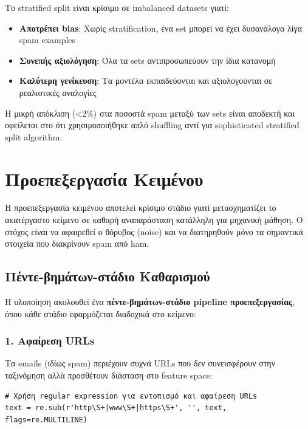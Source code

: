 \documentclass[12pt,a4paper,twoside]{book}
\begin{document}
Το stratified split είναι κρίσιμο σε imbalanced datasets γιατί:

\begin{itemize}
    \item \textbf{Αποτρέπει bias}: Χωρίς stratification, ένα set μπορεί να έχει δυσανάλογα λίγα spam examples
    \item \textbf{Συνεπής αξιολόγηση}: Όλα τα sets αντιπροσωπεύουν την ίδια κατανομή
    \item \textbf{Καλύτερη γενίκευση}: Τα μοντέλα εκπαιδεύονται και αξιολογούνται σε ρεαλιστικές αναλογίες
\end{itemize}

Η μικρή απόκλιση (<2\%) στα ποσοστά spam μεταξύ των sets είναι αποδεκτή και οφείλεται στο ότι χρησιμοποιήθηκε απλό shuffling αντί για sophisticated stratified split algorithm.

\section{Προεπεξεργασία Κειμένου}

Η προεπεξεργασία κειμένου αποτελεί κρίσιμο στάδιο γιατί μετασχηματίζει το ακατέργαστο κείμενο σε καθαρή αναπαράσταση κατάλληλη για μηχανική μάθηση. Ο στόχος είναι να αφαιρεθεί ο θόρυβος (noise) και να διατηρηθούν μόνο τα σημαντικά στοιχεία που διακρίνουν spam από ham.

\subsection{Πέντε-βημάτων-στάδιο Καθαρισμού}

Η υλοποίηση ακολουθεί ένα \textbf{πέντε-βημάτων-στάδιο pipeline προεπεξεργασίας}, όπου κάθε στάδιο εφαρμόζεται διαδοχικά στο κείμενο:

\subsubsection*{1. Αφαίρεση URLs}

Τα emails (ιδίως spam) περιέχουν συχνά URLs που δεν συνεισφέρουν στην ταξινόμηση αλλά προσθέτουν διάσταση στο feature space:

\begin{tcolorbox}[myCustomStyle={URL Removal}]
    \begin{lstlisting}[style=myPythonStyle]
# Χρήση regular expression για εντοπισμό και αφαίρεση URLs
text = re.sub(r'http\S+|www\S+|https\S+', '', text, flags=re.MULTILINE)
\end{lstlisting}
\end{tcolorbox}
\end{document}
